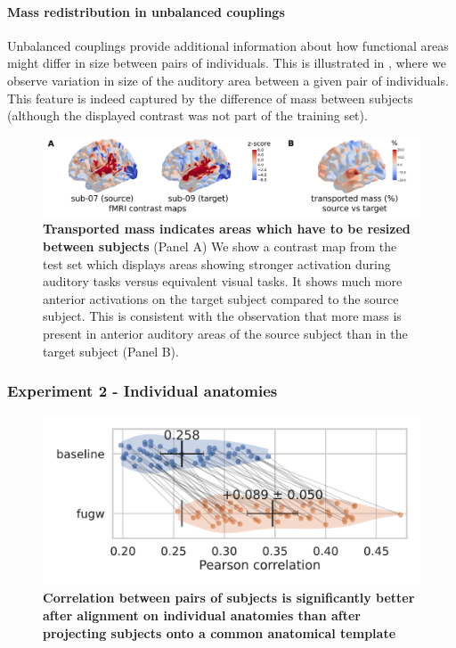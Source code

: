 \paragraph{Mass redistribution in unbalanced couplings}
Unbalanced couplings provide additional information about how functional areas might differ
in size between pairs of individuals. This is illustrated in ,
where we observe variation in size of the auditory area between a given pair of individuals.
This feature is indeed captured by the difference of mass between subjects
(although the displayed contrast was not part of the training set).
\begin{figure}[!th]
    \centering
    \includegraphics[width=1\columnwidth]{./Chapitre4/figures/transported_mass.pdf}
    \caption{
        \textbf{Transported mass indicates areas which have to be resized between subjects}
        (Panel A) We show a contrast map from the test set which displays areas showing
        stronger activation during auditory tasks versus equivalent visual tasks. It shows much more
        anterior activations on the target subject compared to the source subject.
        This is consistent with the observation that more mass is present in
        anterior auditory areas of the source subject than in the target subject (Panel B).
    }
    \label{fig:transported_mass}
\end{figure}

\subsubsection{Experiment 2 - Individual anatomies}
\begin{figure}[!ht]
    \centering
    \includegraphics[width=0.5\columnwidth]{./Chapitre4/figures/individual_alignment_correlation_gain_fugw}
    \caption{
        \textbf{Correlation between pairs of subjects is significantly better after alignment on individual anatomies than after projecting subjects onto a common anatomical template}
    }
    \label{fig:gain_comparisions_individual}
\end{figure}

